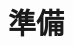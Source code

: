 \documentclass[12pt,a4paper]{beamer}           %
\begin{document}
\title{}
\author{横山侑政}



\section{準備}





\end{document}
